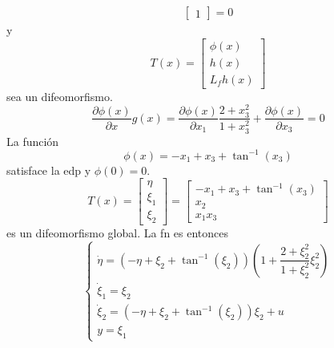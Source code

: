 {\[\begin{aligned}
\begin{bmatrix}
			                                                                                                                                                                1
		                                                                                                                                                                \end{bmatrix} = 0
	\end{aligned}
\]
y
\[
	T(x) = \begin{bmatrix}
		\phi(x) \\
		h(x)    \\
		L_f h(x)
	\end{bmatrix}
\]
sea un difeomorfismo.\\
\[
	\dfrac{\partial\phi(x)}{\partial x}g(x) = \dfrac{\partial\phi(x)}{\partial x_1} \dfrac{2+x_3^2}{1+x_3^2} + \dfrac{\partial\phi(x)}{\partial x_3} = 0
\]
La función
\[
	\phi(x) = -x_1 + x_3 + \tan^{-1}(x_3)
\]
satisface la \gls{edp} y $\phi(0)=0$.\\
\[
	T(x) = \begin{bmatrix}
		\eta  \\
		\xi_1 \\
		\xi_2
	\end{bmatrix} = \begin{bmatrix}
		-x_1 + x_3 + \tan^{-1}(x_3) \\
		x_2                         \\
		x_1x_3
	\end{bmatrix}
\]
es un difeomorfismo global. La \gls{fn} es entonces
\[
	\begin{cases}
		\dot{\eta} = (-\eta + \xi_2 + \tan^{-1}(\xi_2))\left( 1 + \dfrac{2 + \xi_2^2}{1 + \xi_2^2}\xi_2^2 \right) \\
		\dot{\xi}_1 = \xi_2                                                                                       \\
		\dot{\xi}_2 = (-\eta + \xi_2 + \tan^{-1}(\xi_2))\xi_2 + u                                                 \\
		y = \xi_1
	\end{cases}
\]
}